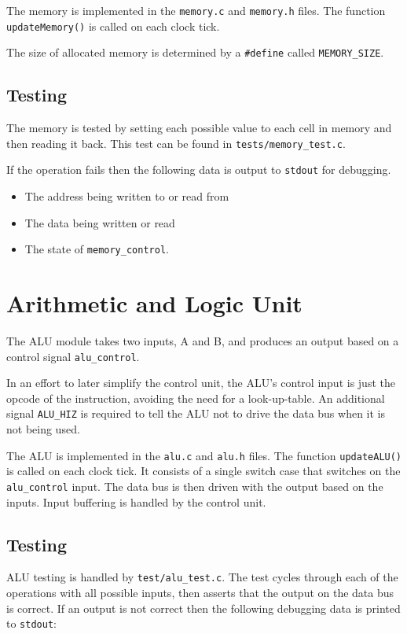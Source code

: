 \documentclass[a4paper]{article}
\begin{document}
The memory is implemented in the \texttt{memory.c} and \texttt{memory.h} files. The function \texttt{updateMemory()} is called on each clock tick.

The size of allocated memory is determined by a \texttt{\#define} called \texttt{MEMORY\_SIZE}.

\subsection{Testing}

The memory is tested by setting each possible value to each cell in memory and then reading it back. This test can be found in \verb|tests/memory_test.c|.

If the operation fails then the following data is output to \texttt{stdout} for debugging.

\begin{itemize}
    \item The address being written to or read from
    \item The data being written or read
    \item The state of \texttt{memory\_control}.
\end{itemize}

\section{Arithmetic and Logic Unit}

The ALU module takes two inputs, A and B, and produces an output based on a control signal \verb|alu_control|.

In an effort to later simplify the control unit, the ALU's control input is just the opcode of the instruction, avoiding the need for a look-up-table. An additional signal \verb|ALU_HIZ| is required to tell the ALU not to drive the data bus when it is not being used.

The ALU is implemented in the \texttt{alu.c} and \texttt{alu.h} files. The function \texttt{updateALU()} is called on each clock tick. It consists of a single switch case that switches on the \texttt{alu\_control} input. The data bus is then driven with the output based on the inputs. Input buffering is handled by the control unit.

\subsection{Testing}

ALU testing is handled by \texttt{test/alu\_test.c}. The test cycles through each of the operations with all possible inputs, then asserts that the output on the data bus is correct. If an output is not correct then the following debugging data is printed to \texttt{stdout}: 
\end{document}
